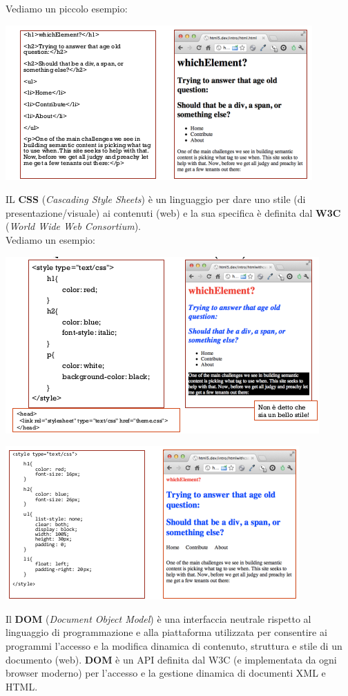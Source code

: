 \documentclass[a4paper,12pt, oneside]{book}
\begin{document}
Vediamo un piccolo esempio:
\begin{center}
	\includegraphics[scale=0.9]{img/html.png}
\end{center}
IL \textbf{CSS} (\textit{Cascading Style Sheets}) è un linguaggio per dare uno stile (di presentazione/visuale) ai contenuti (web) e la sua specifica è definita dal \textbf{W3C} (\textit{World Wide Web Consortium}).
\\Vediamo un esempio:
\begin{center}
	\includegraphics[scale=0.9]{img/css.png}
\end{center}
\begin{center}
	\includegraphics[scale=0.9]{img/css2.png}
\end{center}
Il \textbf{DOM} (\textit{Document Object Model}) è una interfaccia neutrale rispetto al linguaggio di programmazione e alla piattaforma utilizzata per consentire ai programmi l'accesso e la modifica dinamica di contenuto, struttura e stile di un documento (web). \textbf{DOM} è un API definita dal W3C (e implementata da ogni browser moderno) per l'accesso e la gestione dinamica di documenti XML e HTML.\\
\end{document}
